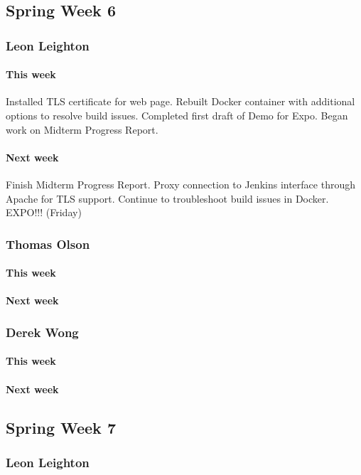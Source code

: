 \documentclass[10pt,letterpaper,onecolumn,draftclsnofoot]{IEEEtran}
\begin{document}
\subsection{Spring Week 6}
\subsubsection{Leon Leighton}
\paragraph{This week}Installed TLS certificate for web page.  
Rebuilt Docker container with additional options to resolve build issues.  
Completed first draft of Demo for Expo.  
Began work on Midterm Progress Report.
\paragraph{Next week}Finish Midterm Progress Report.  
Proxy connection to Jenkins interface through Apache for TLS support.  
Continue to troubleshoot build issues in Docker.  
EXPO!!! (Friday)


\subsubsection{Thomas Olson}
\paragraph{This week}
\paragraph{Next week}


\subsubsection{Derek Wong}
\paragraph{This week}
\paragraph{Next week}


\subsection{Spring Week 7}
\subsubsection{Leon Leighton}
\end{document}
